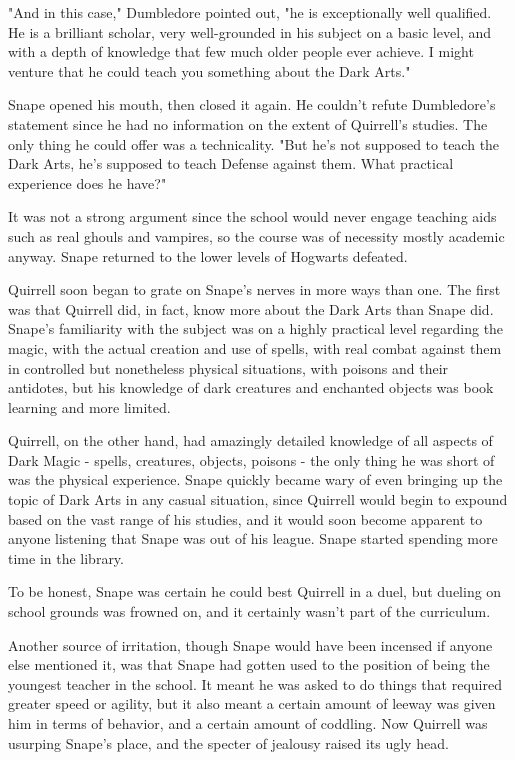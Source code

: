 \documentclass[a4paper,11pt]{article}
\begin{document}
"And in this case," Dumbledore pointed out, "he is exceptionally well qualified. He is a brilliant scholar, very well-grounded in his subject on a basic level, and with a depth of knowledge that few much older people ever achieve. I might venture that he could teach you something about the Dark Arts."

Snape opened his mouth, then closed it again. He couldn't refute Dumbledore's statement since he had no information on the extent of Quirrell's studies. The only thing he could offer was a technicality. "But he's not supposed to teach the Dark Arts, he's supposed to teach Defense against them. What practical experience does he have?"

It was not a strong argument since the school would never engage teaching aids such as real ghouls and vampires, so the course was of necessity mostly academic anyway. Snape returned to the lower levels of Hogwarts defeated.

Quirrell soon began to grate on Snape's nerves in more ways than one. The first was that Quirrell did, in fact, know more about the Dark Arts than Snape did. Snape's familiarity with the subject was on a highly practical level regarding the magic, with the actual creation and use of spells, with real combat against them in controlled but nonetheless physical situations, with poisons and their antidotes, but his knowledge of dark creatures and enchanted objects was book learning and more limited.

Quirrell, on the other hand, had amazingly detailed knowledge of all aspects of Dark Magic - spells, creatures, objects, poisons - the only thing he was short of was the physical experience. Snape quickly became wary of even bringing up the topic of Dark Arts in any casual situation, since Quirrell would begin to expound based on the vast range of his studies, and it would soon become apparent to anyone listening that Snape was out of his league. Snape started spending more time in the library.

To be honest, Snape was certain he could best Quirrell in a duel, but dueling on school grounds was frowned on, and it certainly wasn't part of the curriculum.

Another source of irritation, though Snape would have been incensed if anyone else mentioned it, was that Snape had gotten used to the position of being the youngest teacher in the school. It meant he was asked to do things that required greater speed or agility, but it also meant a certain amount of leeway was given him in terms of behavior, and a certain amount of coddling. Now Quirrell was usurping Snape's place, and the specter of jealousy raised its ugly head.
\end{document}
